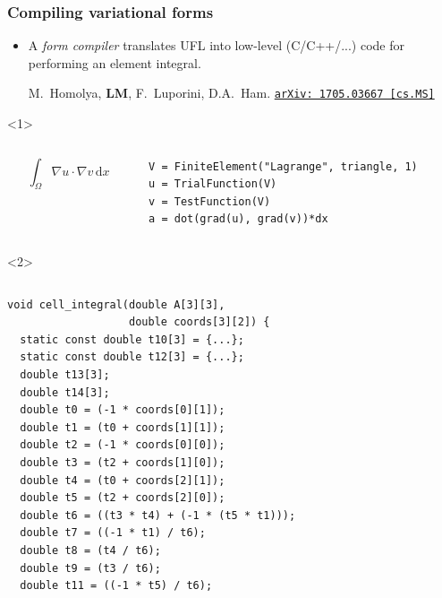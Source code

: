 \documentclass[presentation]{beamer}
\newcommand{\arxivlink}[2]{%
  \href{http://www.arxiv.org/abs/#1}%
  {\texttt{arXiv:\,#1\,[#2]}}%
}
\begin{document}
\begin{frame}[fragile]
  \frametitle{Compiling variational forms}
  \begin{itemize}
  \item A \emph{form compiler} translates UFL into
    low-level (C/C++/...) code for performing an element integral.
    \begin{flushright}
      {\scriptsize M.~Homolya, \textbf{LM}, F.~Luporini, D.A.~Ham. \arxivlink{1705.03667}{cs.MS}}
    \end{flushright}
  \end{itemize}
  \begin{overlayarea}{\textwidth}{0.8\textheight}
  \begin{onlyenv}<1>
  \begin{columns}
    \begin{column}{0.4\textwidth}
      \begin{equation*}
        \int_\Omega \nabla u \cdot \nabla v\,\text{d}x
      \end{equation*}
    \end{column}
    \hspace{-3em}
    \begin{column}{0.6\textwidth}
\begin{verbatim}
V = FiniteElement("Lagrange", triangle, 1)
u = TrialFunction(V)
v = TestFunction(V)
a = dot(grad(u), grad(v))*dx
\end{verbatim}
    \end{column}
  \end{columns}
  \end{onlyenv}
  \begin{onlyenv}<2>
    \begin{columns}
      \begin{column}{0.5\textwidth}
\begin{verbatim}
void cell_integral(double A[3][3],
                   double coords[3][2]) {
  static const double t10[3] = {...};
  static const double t12[3] = {...};
  double t13[3];
  double t14[3];
  double t0 = (-1 * coords[0][1]);
  double t1 = (t0 + coords[1][1]);
  double t2 = (-1 * coords[0][0]);
  double t3 = (t2 + coords[1][0]);
  double t4 = (t0 + coords[2][1]);
  double t5 = (t2 + coords[2][0]);
  double t6 = ((t3 * t4) + (-1 * (t5 * t1)));
  double t7 = ((-1 * t1) / t6);
  double t8 = (t4 / t6);
  double t9 = (t3 / t6);
  double t11 = ((-1 * t5) / t6);
\end{verbatim}
      \end{column}

\end{columns}
\end{onlyenv}
\end{overlayarea}
\end{frame}
\end{document}
